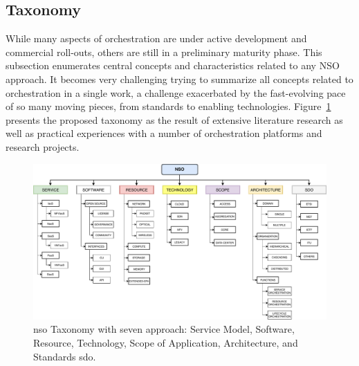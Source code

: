 





\subsection{Taxonomy}

While many aspects of orchestration are under active development and commercial roll-outs, others are still in a preliminary maturity phase. This subsection enumerates central concepts and characteristics related to any NSO approach. It becomes very challenging trying to summarize all concepts related to orchestration in a single work, a challenge exacerbated by the fast-evolving pace of so many moving pieces, from standards to enabling technologies. Figure~\ref{tax} presents the proposed taxonomy as the result of extensive literature research as well as practical experiences with a number of orchestration platforms and research projects.   

\begin{figure}[thpb]
  \centering
  \includegraphics[scale=.51]{Figures/04_NSO/taxonomy}
    \caption{\gls{nso} Taxonomy with seven approach: Service Model, Software, Resource, Technology, Scope of Application, Architecture, and Standards \acrfull{sdo}.}
    \label{tax}
\end{figure}

